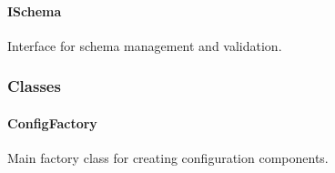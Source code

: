 \hypertarget{ischema}{%
\paragraph{ISchema}\label{ischema}}

Interface for schema management and validation.

\begin{Shaded}
\begin{Highlighting}[]
  \OperatorTok{:} \OperatorTok{,}\OperatorTok{:} \NormalTok{)}\OperatorTok{:} \OperatorTok{;}
  \OperatorTok{:}\OperatorTok{:} \OperatorTok{;}
  \OperatorTok{:} \NormalTok{)}\OperatorTok{:}\OperatorTok{|} \OperatorTok{;}
  \OperatorTok{:} \OperatorTok{,}\OperatorTok{:}\OperatorTok{:} \OperatorTok{;}
  \OperatorTok{:} \NormalTok{)}\OperatorTok{:} \OperatorTok{;}
  \OperatorTok{:} \NormalTok{)}\OperatorTok{:} \OperatorTok{;}
\NormalTok{\}}
\end{Highlighting}
\end{Shaded}

\hypertarget{classes}{%
\subsubsection{Classes}\label{classes}}

\hypertarget{configfactory}{%
\paragraph{ConfigFactory}\label{configfactory}}

Main factory class for creating configuration components.

